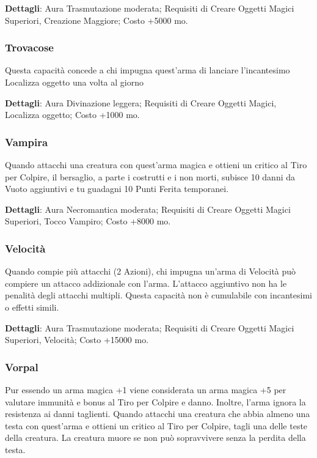 \begin{multicols}{2}
\textbf{Dettagli}: Aura Trasmutazione moderata; Requisiti di Creare Oggetti Magici Superiori, Creazione Maggiore; Costo +5000 mo.

\subsubsection*{Trovacose}
Questa capacità concede a chi impugna quest'arma di lanciare l'incantesimo Localizza oggetto una volta al giorno

\textbf{Dettagli}: Aura Divinazione leggera; Requisiti di Creare Oggetti Magici, Localizza oggetto; Costo +1000 mo.

\subsubsection*{Vampira}

Quando attacchi una creatura con quest'arma magica e ottieni un critico al Tiro per Colpire, il bersaglio, a parte i costrutti e i non morti, subisce 10 danni da Vuoto aggiuntivi e tu guadagni 10 Punti Ferita temporanei.

\textbf{Dettagli}: Aura Necromantica moderata; Requisiti di Creare Oggetti Magici Superiori, Tocco Vampiro; Costo +8000 mo.

\subsubsection*{Velocità}

Quando compie più attacchi (2 Azioni), chi impugna un'arma di Velocità può compiere un attacco addizionale con l'arma. L'attacco aggiuntivo non ha le penalità degli attacchi multipli. Questa capacità non è cumulabile con incantesimi o effetti simili.

\textbf{Dettagli}: Aura Trasmutazione moderata; Requisiti di Creare Oggetti Magici Superiori, Velocità; Costo +15000 mo.

\subsubsection*{Vorpal}

Pur essendo un arma magica +1 viene considerata un arma magica +5 per valutare immunità e bonus al Tiro per Colpire e danno. Inoltre, l'arma ignora la resistenza ai danni taglienti. Quando attacchi una creatura che abbia almeno una testa con quest'arma e ottieni un critico al Tiro per Colpire, tagli una delle teste della creatura. La creatura muore se non può sopravvivere senza la perdita della testa.


\end{multicols}
